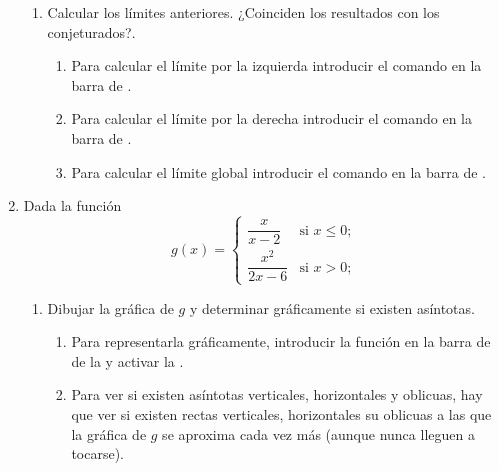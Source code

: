 \begin{enumerate}[leftmargin=*]
\begin{enumerate}
      \item Calcular los límites anteriores. ¿Coinciden los resultados con los conjeturados?.
            \begin{indication}
            \begin{enumerate}
            \item Para calcular el límite por la izquierda introducir el comando  en la barra de .
            \item Para calcular el límite por la derecha introducir el comando  en la barra de .
            \item Para calcular el límite global introducir el comando en la barra de .
            \end{enumerate}
            \end{indication}
      \end{enumerate}


\item Dada la función
      \[
      g(x)=
      \begin{cases}
      \dfrac{x}{x-2}    & \mbox{si $x\leq 0$;} \\
      \dfrac{x^2}{2x-6} & \mbox{si $x>0$;}
      \end{cases}
      \]
      \begin{enumerate}
      \item Dibujar la gráfica de $g$ y determinar gráficamente si existen asíntotas.
            \begin{indication}
            \begin{enumerate}
            \item Para representarla gráficamente, introducir la función  en la barra de  de la  y activar la .
            \item Para ver si existen asíntotas verticales, horizontales y oblicuas, hay que ver si existen rectas verticales, horizontales su oblicuas a las que la gráfica de $g$ se aproxima cada vez más (aunque nunca lleguen a tocarse).
            \end{enumerate}
            \end{indication}


\end{enumerate}
\end{enumerate}
